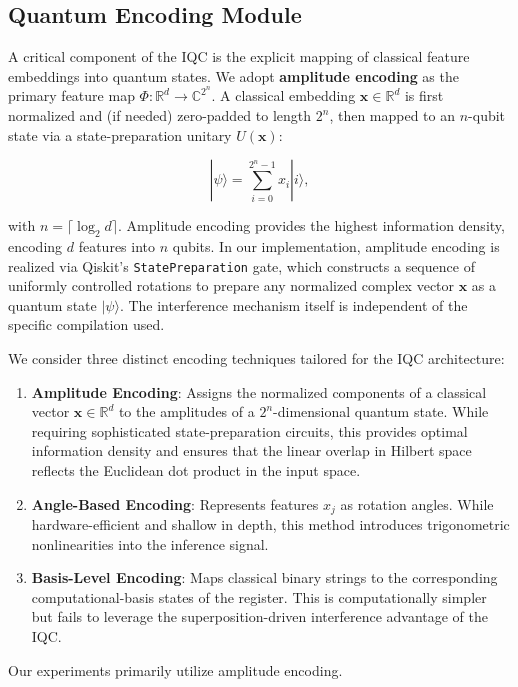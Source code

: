 \documentclass[conference]{IEEEtran}
\begin{document}
\subsection{Quantum Encoding Module}
A critical component of the IQC is the explicit mapping of classical feature embeddings into quantum states. We adopt \textbf{amplitude encoding} as the primary feature map $\Phi: \mathbb{R}^d \rightarrow \mathbb{C}^{2^n}$. A classical embedding $\mathbf{x} \in \mathbb{R}^d$ is first normalized and (if needed) zero-padded to length $2^n$, then mapped to an $n$-qubit state via a state-preparation unitary $U(\mathbf{x})$:

\begin{equation}
|\psi\rangle = \sum_{i=0}^{2^n - 1} x_i |i\rangle,
\end{equation}

with $n = \lceil \log_2 d \rceil$. Amplitude encoding provides the highest information density, encoding $d$ features into $n$ qubits. In our implementation, amplitude encoding is realized via Qiskit's \texttt{StatePreparation} gate, which constructs a sequence of uniformly controlled rotations to prepare any normalized complex vector $\mathbf{x}$ as a quantum state $|\psi\rangle$. The interference mechanism itself is independent of the specific compilation used.

We consider three distinct encoding techniques tailored for the IQC architecture:
\begin{enumerate}
    \item \textbf{Amplitude Encoding}: Assigns the normalized components of a classical vector $\mathbf{x} \in \mathbb{R}^d$ to the amplitudes of a $2^n$-dimensional quantum state. While requiring sophisticated state-preparation circuits, this provides optimal information density and ensures that the linear overlap in Hilbert space reflects the Euclidean dot product in the input space.
    \item \textbf{Angle-Based Encoding}: Represents features $x_j$ as rotation angles. While hardware-efficient and shallow in depth, this method introduces trigonometric nonlinearities into the inference signal.
    \item \textbf{Basis-Level Encoding}: Maps classical binary strings to the corresponding computational-basis states of the register. This is computationally simpler but fails to leverage the superposition-driven interference advantage of the IQC.
\end{enumerate}
Our experiments primarily utilize amplitude encoding.
\end{document}
